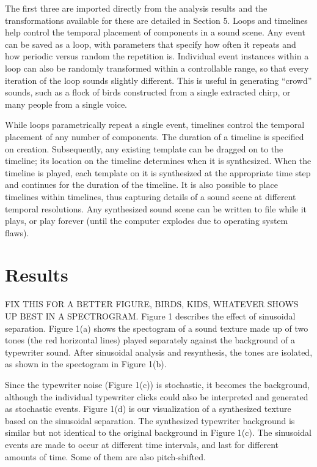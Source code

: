 \documentclass{acmsiggraph}               %
\begin{document}
The first three are imported directly from the analysis results and the transformations available for these are detailed in Section 5. Loops and timelines help control the temporal placement of components in a sound scene. Any event can be saved as a loop, with parameters that specify how often it repeats and how periodic versus random the repetition is. Individual event instances within a loop can also be randomly transformed within a controllable range, so that every iteration of the loop sounds slightly different. This is useful in generating "`crowd"' sounds, such as a flock of birds constructed from a single extracted chirp, or many people from a single voice. 

While loops parametrically repeat a single event, timelines control the temporal placement of any number of components. The duration of a timeline is specified on creation. Subsequently, any existing template can be dragged on to the timeline; its location on the timeline determines when it is synthesized. When the timeline is played, each template on it is synthesized at the appropriate time step and continues for the duration of the timeline. It is also possible to place timelines within timelines, thus capturing details of a sound scene at different temporal resolutions. Any synthesized sound scene can be written to file while it plays, or play forever (until the computer explodes due to operating system flaws).  

\section{Results}

FIX THIS FOR A BETTER FIGURE, BIRDS, KIDS, WHATEVER SHOWS UP BEST IN A 
SPECTROGRAM.  
Figure 1 describes the effect of sinusoidal 
separation. Figure 1(a) shows the spectogram of a sound texture made up 
of two tones (the red horizontal lines) played separately against the 
background of a typewriter sound. After sinusoidal analysis and 
resynthesis, the tones are isolated, as shown in the spectogram in 
Figure 1(b). 

Since the typewriter noise 
(Figure 1(c)) is stochastic, it becomes the background, although the 
individual typewriter clicks could also be interpreted and generated as 
stochastic events. Figure 1(d) is our visualization of a synthesized 
texture based on the sinusoidal separation. The synthesized typewriter 
background is similar but not identical to the original background in 
Figure 1(c). The sinusoidal events are made to occur at different time 
intervals, and last for different amounts of time. Some of them are also 
pitch-shifted.
\end{document}
